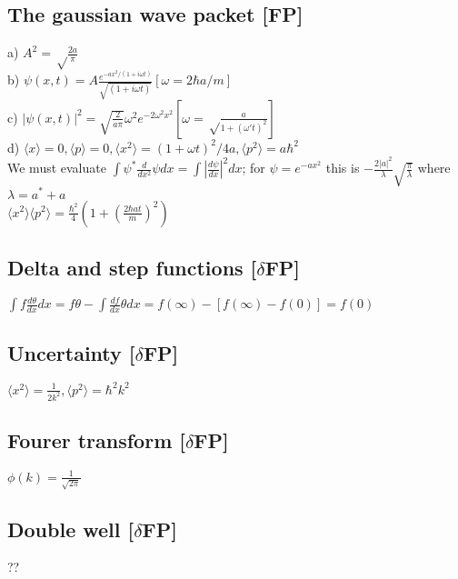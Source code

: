 \documentclass{article}
\newcommand{\<}{\langle}
\renewcommand{\>}{\rangle}
\begin{document}
\subsection{The gaussian wave packet [FP]}

a) $A^2 = \sqrt\frac{2a}{\pi}$ \\
b) $\psi(x,t) = A\frac{e^{-ax^2/(1+i\omega t)}} {\sqrt{(1+i\omega t)}} [\omega = 2\hbar a / m] $ \\
c) $|\psi(x,t)|^2 = \sqrt{\frac{2}{a\pi}} \omega^2 e^{-2\omega^2x^2} [\omega = \sqrt\frac{a}{1+(\omega' t)^2}]$ \\
d) $\<x\> = 0, \<p\> = 0, \<x^2\> = (1+\omega t)^2 / 4a, \<p^2\> = a \hbar^2$
\\
We must evaluate $\int \psi^* \frac{d}{dx^2} \psi dx = \int |\frac{d\psi}{dx}|^2 dx$; for $\psi = e^{-ax^2}$ this is $-\frac{2|a|^2}{\lambda} \sqrt{\frac{\pi}{\lambda}}$ where $\lambda = a^* + a$
\\
$\<x^2\>\<p^2\> = \frac{\hbar^2}{4} (1 + (\frac{2\hbar a t}{m})^2)$

\subsection{}

\subsection{Delta and step functions [$\delta$FP]}

$\int f \frac{d\theta}{dx} dx = f\theta - \int \frac{df}{dx} \theta dx = f(\infty) - [f(\infty) - f(0)] = f(0) $

\subsection{Uncertainty [$\delta$FP]}

$\<x^2\> = \frac{1}{2k^2}, \<p^2\> = \hbar^2k^2$

\subsection{Fourer transform [$\delta$FP]}

$\phi(k) = \frac{1}{\sqrt{2\pi}}$

\subsection{Double well [$\delta$FP]}

??
\end{document}
